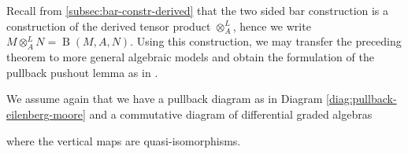 \documentclass{scrartcl}
\theoremstyle{plain}
\newtheorem{theorem}{Theorem}[section]
\theoremstyle{definition}
\newcommand{\APL}{A_{PL}}
\newcommand{\from}{\leftarrow}
\DeclareMathOperator{\BC}{B}
\begin{document}
    

Recall from \cref{subsec:bar-constr-derived} that the two sided bar construction is a construction of the derived tensor product $\otimes_A^L$, hence we write $M\otimes_A^L N = \BC(M, A, N)$. Using this construction, we may transfer the preceding theorem to more general algebraic models and obtain the formulation of the pullback pushout lemma as in \cite{naef2019string}.

We assume again that we have a pullback diagram as in Diagram \ref{diag:pullback-eilenberg-moore} and a commutative diagram of differential graded algebras
\begin{center}
\end{center}
where the vertical maps are quasi-isomorphisms. 
\end{document}
